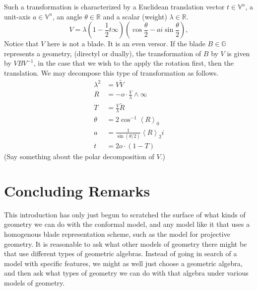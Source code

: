 \documentclass[12pt]{article}
\newcommand{\G}{\mathbb{G}}
\newcommand{\V}{\mathbb{V}}
\newcommand{\R}{\mathbb{R}}
\newcommand{\nvao}{o}
\newcommand{\nvai}{\infty}
\begin{document}
Such a transformation is characterized by a Euclidean translation vector $t\in\V^n$, a unit-axis $a\in\V^n$,
an angle $\theta\in\R$ and a scalar (weight) $\lambda\in\R$.
\begin{equation*}
V = \lambda\left(1-\frac{1}{2}t\nvai\right)\left(\cos\frac{\theta}{2}-ai\sin\frac{\theta}{2}\right),
\end{equation*}
Notice that $V$ here is not a blade.  It is an even versor.  If the blade $B\in\G$ represents
a geometry, (directyl or dually), the transformation of $B$ by $V$ is given by $VBV^{-1}$,
in the case that we wish to the apply the rotation first, then the translation.
We may decompose this type of transformation as follows.
\begin{align*}
\lambda^2 &= V\tilde{V} \\
R &= -\nvao\cdot\frac{V}{\lambda}\wedge\nvai \\
T &= \frac{V}{\lambda}\tilde{R} \\
\theta &= 2\cos^{-1}\left\langle R\right\rangle_0 \\
a &= \frac{1}{\sin(\theta/2)}\left\langle R\right\rangle_2 i \\
t &= 2\nvao\cdot(1-T)
\end{align*}
(Say something about the polar decomposition of $V$.)

\section{Concluding Remarks}

This introduction has only just begun to scratched the surface of
what kinds of geometry we can do with the conformal model, and
any model like it that uses a homogenous blade representation scheme,
such as the model for projective geometry.  It is reasonable to ask
what other models of geometry there might be that use different
types of geometric algebras.  Instead of going in search of a model
with specific features, we might as well just choose a geometric algebra,
and then ask what types of geometry we can do with that algebra under
various models of geometry.



\end{document}
